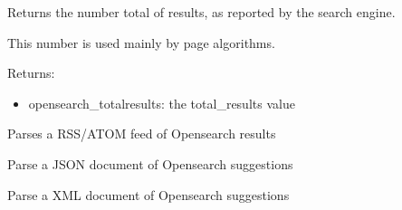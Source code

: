 \documentclass[letterpaper,10pt,english]{sphinxmanual}
\begin{document}
\begin{fulllineitems}
\begin{fulllineitems}
\begin{itemize}
\end{itemize}

\end{fulllineitems}


\begin{fulllineitems}
\label{api2.0:puppy.model.Response.get_totalresults}
Returns the number total of results, as reported by the search engine.

This number is used mainly by page algorithms.

Returns:
\begin{itemize}
\item {} 
opensearch\_totalresults: the total\_results value

\end{itemize}

\end{fulllineitems}


\begin{fulllineitems}
\label{api2.0:puppy.model.Response.parse_feed}
Parses a RSS/ATOM feed of Opensearch results

\end{fulllineitems}


\begin{fulllineitems}
\label{api2.0:puppy.model.Response.parse_json_suggestions}
Parse a JSON document of Opensearch suggestions

\end{fulllineitems}


\begin{fulllineitems}
\label{api2.0:puppy.model.Response.parse_xml_suggestions}
Parse a XML document of Opensearch suggestions

\end{fulllineitems}


\end{fulllineitems}
\end{document}
